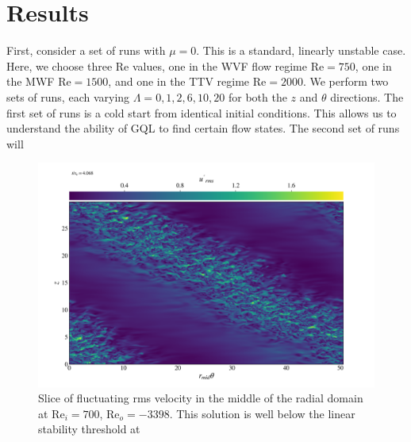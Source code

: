 \documentclass[openacc]{rstransa}%
\newcommand{\Reyn}{\mathrm{Re}}
\begin{document}
\section{Results}
\label{sec:nonlinear}

First, consider a set of runs with $\mu = 0$. This is a standard, linearly unstable case. Here, we choose three $\Reyn$ values, one in the WVF flow regime $\Reyn =750$, one in the MWF $\Reyn = 1500$, and one in the TTV regime $\Reyn = 2000$. We perform two sets of runs, each varying $\Lambda = {0, 1, 2, 6, 10, 20}$ for both the $z$ and $\theta$ directions. The first set of runs is a cold start from identical initial conditions. This allows us to understand the ability of GQL to find certain flow states. The second set of runs will 

\begin{figure}
    \centering
    \includegraphics[width=\textwidth]{../figs/urms_tz_rei_700_reo-3398_000278.png}
    \caption{Slice of fluctuating rms velocity in the middle of the radial domain at $\Reyn_i = 700$, $\Reyn_o = -3398$. This solution is well below the linear stability threshold at }
    \label{fig:urms_tz_rei700}
\end{figure}
\end{document}
